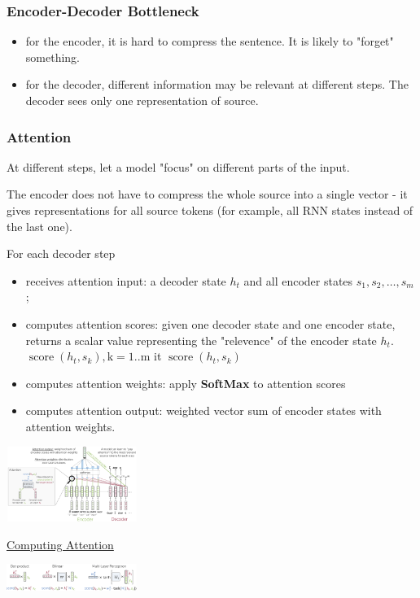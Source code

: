 \documentclass[8pt]{extarticle} %
\begin{document}
\begin{multicols*}{3}
\subsubsection*{Encoder-Decoder Bottleneck}
\begin{itemize}[label=\textbullet, labelsep=0.3em, leftmargin=0.5em, itemsep=0em]
    \item for the encoder, it is hard to compress the sentence. It is likely to "forget" something. 
    \item for the decoder, different information may be relevant at different steps. The decoder sees only one representation of source.
\end{itemize}

\subsubsection*{Attention}
At different steps, let a model "focus" on different parts of the input.

The encoder does not have to compress the whole source into a single vector - it gives representations for all source tokens (for example, all RNN states instead of the last one).

For each decoder step
\begin{itemize}[label=\textbullet, labelsep=0.3em, leftmargin=0.5em, itemsep=0em]
\item receives attention input: a decoder state $h_t$ and all encoder states $s_1, s_2, \ldots, s_m$;
\item computes attention scores: given one decoder state and one encoder state, returns a scalar value representing the "relevence" of the encoder state
 $h_t$. $\operatorname{score}\left(h_t, s_k\right), \mathrm{k}=1 . . \mathrm{m}$ it  $\operatorname{score}\left(h_t, s_k\right)$
\item computes attention weights: apply \textbf{SoftMax} to attention scores
\item computes attention output: weighted vector sum of encoder states with attention weights.
\end{itemize}
\begin{center}
    \includegraphics[width=0.32\textwidth]{media/attention.png}
\end{center}
\underline{Computing Attention}
\begin{center}
    \includegraphics[width=0.32\textwidth]{media/comp-attention.png}
\end{center}


\end{multicols*}
\end{document}
